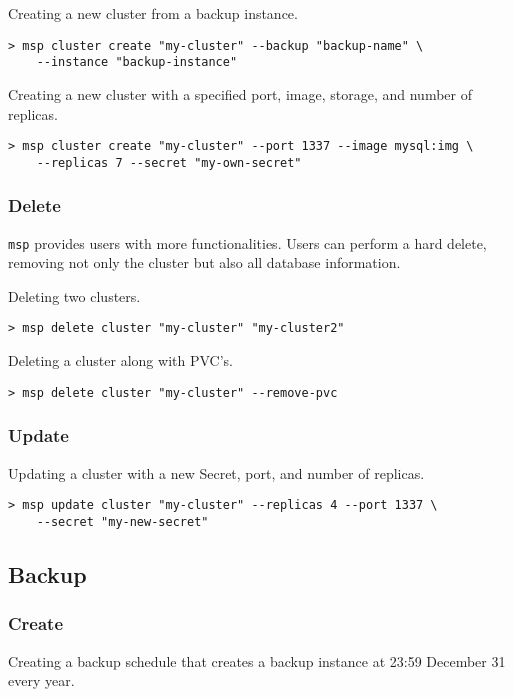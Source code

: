 \noindent Creating a new cluster from a backup instance.

\begin{lstlisting}
> msp cluster create "my-cluster" --backup "backup-name" \
	--instance "backup-instance"
\end{lstlisting}

\noindent Creating a new cluster with a specified port, image, storage, and number of replicas.

\begin{lstlisting}
> msp cluster create "my-cluster" --port 1337 --image mysql:img \
	--replicas 7 --secret "my-own-secret"
\end{lstlisting}

\subsubsection*{Delete}

\texttt{msp} provides users with more functionalities. Users can perform a hard
delete, removing not only the cluster but also all database information.

\noindent Deleting two clusters.

\begin{lstlisting}
> msp delete cluster "my-cluster" "my-cluster2"
\end{lstlisting}

\noindent Deleting a cluster along with PVC’s.

\begin{lstlisting}
> msp delete cluster "my-cluster" --remove-pvc
\end{lstlisting}

\subsubsection*{Update}
\noindent Updating a cluster with a new Secret, port, and number of replicas.

\begin{lstlisting}
> msp update cluster "my-cluster" --replicas 4 --port 1337 \
	--secret "my-new-secret"
\end{lstlisting}

\subsection{Backup}

\subsubsection*{Create}
\noindent Creating a backup schedule that creates a backup instance at 23:59 December 31 every year.

